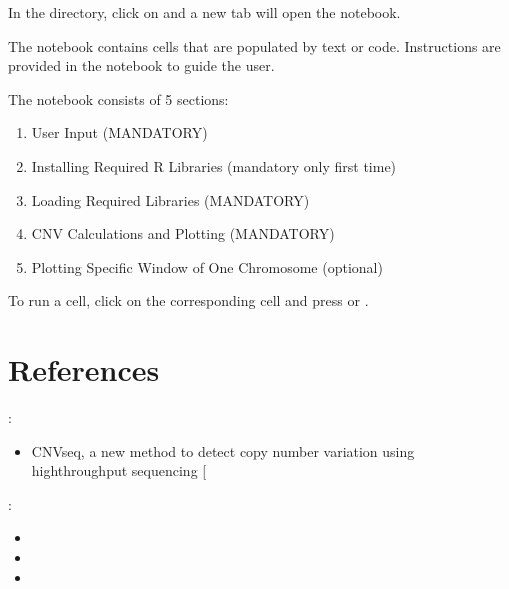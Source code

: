 \documentclass[letterpaper,10pt,english]{sphinxhowto}
\begin{document}
\sphinxAtStartPar
In the  directory, click on  and a new tab will open the notebook.

\sphinxAtStartPar
The notebook contains cells that are populated by text or code. Instructions are provided in the notebook to guide the user.

\sphinxAtStartPar
The notebook consists of 5 sections:
\begin{enumerate}
%
\item {} 
\sphinxAtStartPar
User Input (MANDATORY)

\item {} 
\sphinxAtStartPar
Installing Required R Libraries (mandatory only first time)

\item {} 
\sphinxAtStartPar
Loading Required Libraries (MANDATORY)

\item {} 
\sphinxAtStartPar
CNV Calculations and Plotting (MANDATORY)

\item {} 
\sphinxAtStartPar
Plotting Specific Window of One Chromosome (optional)

\end{enumerate}

\sphinxAtStartPar
To run a cell, click on the corresponding cell and press  or .


\section{References}
\label{\detokenize{index:references}}
\sphinxAtStartPar
{}:
\begin{itemize}
\item {} 
\sphinxAtStartPar
CNV\sphinxhyphen{}seq, a new method to detect copy number variation using high\sphinxhyphen{}throughput sequencing {[}\sphinxhref{https://bmcbioinformatics.biomedcentral.com/articles/10.1186/1471-2105-10-80}{LINK}{]}

\end{itemize}

\sphinxAtStartPar
{}:
\begin{itemize}
\item {} 
\sphinxAtStartPar
{}

\item {} 
\sphinxAtStartPar
{}

\item {} 
\sphinxAtStartPar
{}

\end{itemize}



\renewcommand{\indexname}{Index}
\printindex
\end{document}
